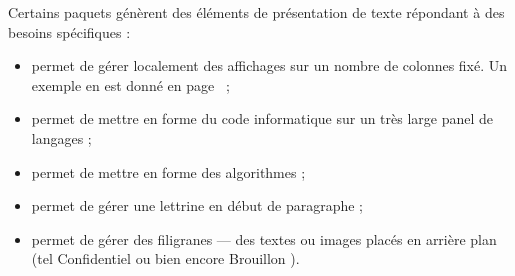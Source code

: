 Certains paquets génèrent des éléments de présentation de texte répondant à des besoins spécifiques :
\begin{itemize}
\item {} permet de gérer localement des affichages sur un nombre de colonnes fixé. Un exemple en est donné en page~\pageref{multicol} ;
\item {} permet de mettre en forme du code informatique sur un très large panel de langages ;
\item {} permet de mettre en forme des algorithmes ;
\item {} permet de gérer une lettrine en début de paragraphe ;
\item {} permet de gérer des filigranes  --- des textes ou images placés en arrière plan (tel \og Confidentiel \fg ou bien encore \og Brouillon \fg).
\end{itemize}